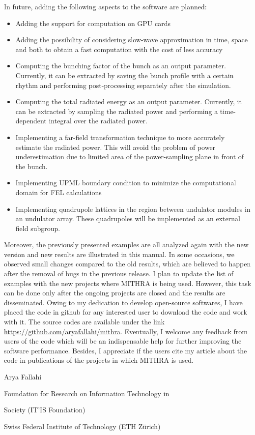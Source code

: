 %
In future, adding the following aspects to the software are planned:
%
\begin{itemize}
	\setlength{\parskip}{0pt}
	\setlength{\itemsep}{0pt plus 1pt}
	\item Adding the support for computation on GPU cards
	\item Adding the possibility of considering slow-wave approximation in time, space and both to obtain a fast computation with the cost of less accuracy
	\item Computing the bunching factor of the bunch as an output parameter. Currently, it can be extracted by saving the bunch profile with a certain rhythm and performing post-processing separately after the simulation.
	\item Computing the total radiated energy as an output parameter. Currently, it can be extracted by sampling the radiated power and performing a time-dependent integral over the radiated power.
	\item Implementing a far-field transformation technique to more accurately estimate the radiated power. This will avoid the problem of power underestimation due to limited area of the power-sampling plane
	 in front of the bunch.
	\item Implementing UPML boundary condition to minimize the computational domain for FEL calculations
	\item Implementing quadrupole lattices in the region between undulator modules in an undulator array. These quadrupoles will be implemented as an external field subgroup. 
\end{itemize}
%
Moreover, the previously presented examples are all analyzed again with the new version and new results are illustrated in this manual.
%
In some occasions, we observed small changes compared to the old results, which are believed to happen after the removal of bugs in the previous release.
%
I plan to update the list of examples with the new projects where MITHRA is being used.
%
However, this task can be done only after the ongoing projects are closed and the results are disseminated.
%
Owing to my dedication to develop open-source softwares, I have placed the code in github for any interested user to download the code and work with it.
%
The source codes are available under the link \href{https://github.com/aryafallahi/mithra}{https://github.com/aryafallahi/mithra}.
%
Eventually, I welcome any feedback from users of the code which will be an indispensable help for further improving the software performance.
%
Besides, I appreciate if the users cite my article about the code \cite{fallahi2018mithra} in publications of the projects in which MITHRA is used.

\vspace{1cm}

\hspace{10cm} Arya Fallahi

\hspace{10cm} Foundation for Research on Information Technology in 

\hspace{10cm} Society (IT'IS Foundation)

\hspace{10cm} Swiss Federal Institute of Technology (ETH Z\"urich)